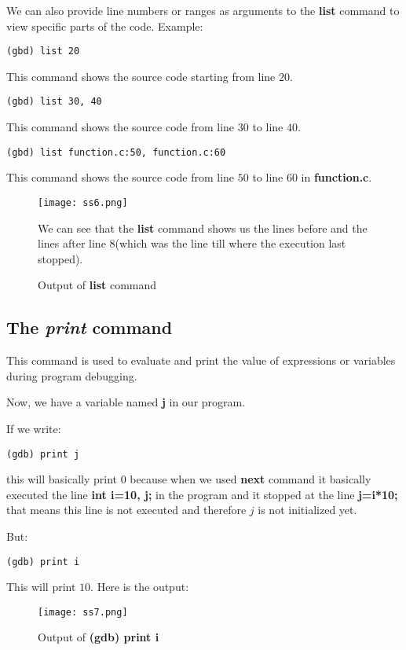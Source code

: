 \documentclass{article}
\makeatletter
\renewcommand\paragraph{\@startsection{paragraph}{4}{\z@}{-3.25ex \@plus -1ex \@minus -.2ex}{1.5ex \@plus .2ex}{\normalfont\normalsize\bfseries}}
\makeatother
\begin{document}
We can also provide line numbers or ranges as arguments to the \textbf{list} command to view specific parts of the code.
Example:
\begin{Verbatim}[frame=single]
(gbd) list 20
\end{Verbatim}

This command shows the source code starting from line $20$.

\begin{Verbatim}[frame=single]
(gbd) list 30, 40
\end{Verbatim}

This command shows the source code from line $30$ to line $40$.

\begin{Verbatim}[frame=single]
(gbd) list function.c:50, function.c:60
\end{Verbatim}

This command shows the source code from line $50$ to line $60$ in \textbf{function.c}.
\begin{figure}[h]
\centering
\texttt{[image: ss6.png]}
\caption{Output of \textbf{list} command}
\vspace{10pt}
We can see that the \textbf{list} command shows us the lines before and the lines after line $8$(which was the line till where the execution last stopped).
\end{figure}

\newpage
\subsection{The \textit{print} command}
\paragraph{}
This command is used to evaluate and print the value of expressions or variables during program debugging.

Now, we have a variable named \textbf{j} in our program.

If we write:
\begin{Verbatim}[frame=single]
(gdb) print j
\end{Verbatim}

this will basically print $0$ because when we used \textbf{next} command it basically executed the line \textbf{int i=10, j;} in the program and it stopped at the line \textbf{j=i*10;} that means this line is not executed and therefore $j$ is not initialized yet.

But:
\begin{Verbatim}[frame=single]
(gdb) print i
\end{Verbatim}
This will print $10$.
Here is the output:
\begin{figure}[h]
\centering
\texttt{[image: ss7.png]}
\caption{Output of \textbf{(gdb) print i}}
\end{figure}
\end{document}

